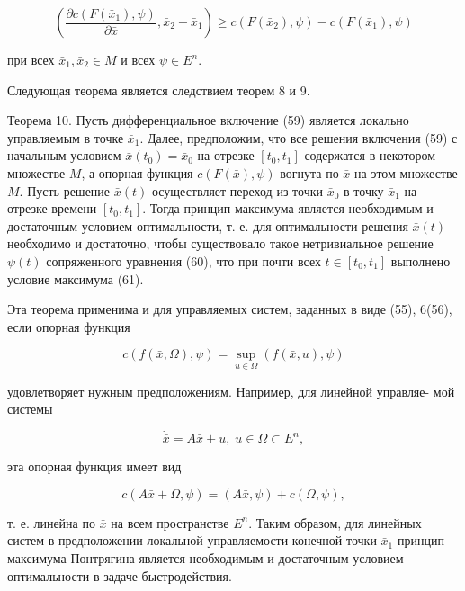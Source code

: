 \documentclass[10pt]{article}
\begin{document}
\[
\left( {\frac{\partial c\left( {F\left( {\bar{x}}_{1}\right),\psi }\right) }{\partial \bar{x}},{\bar{x}}_{2} - {\bar{x}}_{1}}\right)  \geq  c\left( {F\left( {\bar{x}}_{2}\right),\psi }\right)  - c\left( {F\left( {\bar{x}}_{1}\right),\psi }\right)
\]

при всех \({\bar{x}}_{1},{\bar{x}}_{2} \in  M\) и всех \(\psi \in  {E}^{n}\).

Следующая теорема является следствием теорем 8 и 9.

Теорема 10. Пусть дифференциальное включение (59) является локально управляемым в точке \({\bar{x}}_{1}\). Далее, предположим, что все решения включения (59) с начальным условием \(\bar{x}\left( {t}_{0}\right)  = {\bar{x}}_{0}\) на отрезке \(\left\lbrack  {{t}_{0},{t}_{1}}\right\rbrack\) содержатся в некотором множестве \(M\), а опорная функция \(c\left( {F\left( \bar{x}\right),\psi }\right)\) вогнута по \(\bar{x}\) на этом множестве \(M\). Пусть решение \(\bar{x}\left( t\right)\) осуществляет переход из точки \({\bar{x}}_{0}\) в точку \({\bar{x}}_{1}\) на отрезке времени \(\left\lbrack  {{t}_{0},{t}_{1}}\right\rbrack\). Тогда принцип максимума является необходимым и достаточным условием оптимальности, т. е. для оптимальности решения \(\bar{x}\left( t\right)\) необходимо и достаточно, чтобы существовало такое нетривиальное решение \(\psi \left( t\right)\) сопряженного уравнения (60), что при почти всех \(t \in \left\lbrack  {{t}_{0},{t}_{1}}\right\rbrack\) выполнено условие максимума (61).

Эта теорема применима и для управляемых систем, заданных в виде (55), 6(56), если опорная функция

\[
c\left( {f\left( {\bar{x},\Omega }\right),\psi }\right)  = \mathop{\sup }\limits_{{u \in  \Omega }}\left( {f\left( {\bar{x},u}\right),\psi }\right)
\]

удовлетворяет нужным предположениям. Например, для линейной управляе- мой системы

\[
\dot{\bar{x}} = A\bar{x} + u,\;u \in  \Omega  \subset  {E}^{n},
\]

эта опорная функция имеет вид

\[
c\left( {A\bar{x} + \Omega,\psi }\right)  = \left( {A\bar{x},\psi }\right)  + c\left( {\Omega,\psi }\right),
\]

т. е. линейна по \(\bar{x}\) на всем пространстве \({E}^{n}\). Таким образом, для линейных систем в предположении локальной управляемости конечной точки \({\bar{x}}_{1}\) принцип максимума Понтрягина является необходимым и достаточным условием оптимальности в задаче быстродействия.
\end{document}
